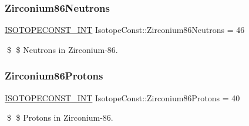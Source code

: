 \subsubsection{\texorpdfstring{Zirconium86\+Neutrons}{Zirconium86Neutrons}}
{\footnotesize\ttfamily \mbox{\hyperlink{group___isotope_const-_macros_ga5f18360b3e99483a35c32d789e62621c}{I\+S\+O\+T\+O\+P\+E\+C\+O\+N\+S\+T\+\_\+\+I\+NT}} Isotope\+Const\+::\+Zirconium86\+Neutrons = 46}

\$ \$ Neutrons in Zirconium-\/86. \mbox{\label{group___isotope_const-_zirconium-_zr86_ga2ca77d467d82a3b9893c17b06075992f}} 
\subsubsection{\texorpdfstring{Zirconium86\+Protons}{Zirconium86Protons}}
{\footnotesize\ttfamily \mbox{\hyperlink{group___isotope_const-_macros_ga5f18360b3e99483a35c32d789e62621c}{I\+S\+O\+T\+O\+P\+E\+C\+O\+N\+S\+T\+\_\+\+I\+NT}} Isotope\+Const\+::\+Zirconium86\+Protons = 40}

\$ \$ Protons in Zirconium-\/86. 